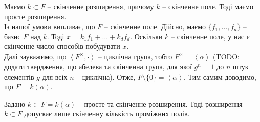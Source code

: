 \documentclass{math_library}
\begin{document}
\begin{example}
\label{finite_extension_of_a_finite_field_is_simple}
Маємо $k \subset F$ -- скінченне розширення, причому $k$ -- скінченне поле. Тоді маємо просте розширення.\\
Із нашої умови випливає, що $F$ -- скінченне поле. Дійсно, маємо $\{f_1,\dots,f_d\}$ -- базис $F$ над $k$. Тоді $x = k_1 f_1 + \dots + k_d f_d$. Оскільки $k$ -- скінченне поле, у нас є скінченне число способів побудувати $x$.\\
Далі зауважимо, що $\left<F^\times,\cdot \right>$ -- циклічна група, тобто $F^\times = \left< \alpha \right>$ (TODO: додати твердження, що абелева та скінченна група, для якої $g^n = 1$ до $n$ штук елементів $g$ для всіх $n$ -- циклічна). Отже, $F \setminus \{0\} = \left< \alpha \right>$. Тим самим доводимо, що $F = k(\alpha)$.
\end{example}

\begin{proposition}
Задано $k \subset F = k(\alpha)$ -- просте та скінченне розширення. Тоді розширення $k \subset F$ допускає лише скінченну кількість проміжних полів.
\end{proposition}
\end{document}
